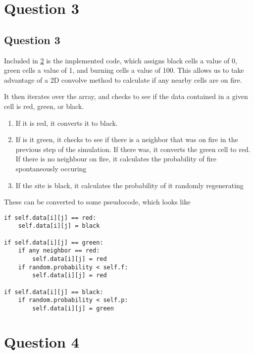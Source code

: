 \documentclass[11pt,a4paper]{article}
\begin{document}
\section{Question 3}
\label{sec:question3}


\subsection{Question 3}
\label{sec:question3:subsec:parta}
Included in \ref{sec:question4} is the implemented code, which assigns black cells a value of 0, green cells a value of 1, and burning cells a value of 100. This allows us to take advantage of a 2D convolve method to calculate if any nearby cells are on fire. 
 
It then iterates over the array, and checks to see if the data contained in a given cell is red, green, or black. 

\begin{enumerate}
\item If it is red, it converts it to black. 
\item If is it green, it checks to see if there is a neighbor that was on fire in the previous step of the simulation. If there was, it converts the green cell to red. If there is no neighbour on fire, it calculates the probability of fire spontaneously occuring
\item If the site is black, it calculates the probability of it randomly regenerating
\end{enumerate} 

These can be converted to some pseudocode, which looks like 
\begin{lstlisting}
if self.data[i][j] == red:
	self.data[i][j] = black

if self.data[i][j] == green:
	if any neighbor == red:
		self.data[i][j] = red
	if random.probability < self.f:
		self.data[i][j] = red

if self.data[i][j] == black:
	if random.probability < self.p:
		self.data[i][j] = green
\end{lstlisting}
\section{Question 4}
\label{sec:question4}
\end{document}
